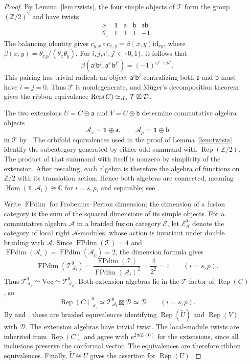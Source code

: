 \documentclass[11pt,reqno]{amsart}
\theoremstyle{definition}\newtheorem{definition}[theorem]{Definition}
\theoremstyle{remark}\newtheorem{remark}[theorem]{Remark}
\newcommand{\C}{\mathbb C}\newcommand{\Z}{\mathbb Z}\newcommand{\Q}{\mathbb Q}
\newcommand{\one}{\mathbf1}\newcommand{\slc}{\mathfrak{sl}_2}
\newcommand{\Rep}{\operatorname{Rep}}
\newcommand{\FPdim}{\operatorname{FPdim}}\newcommand{\Vir}{\operatorname{Vir}}
\newcommand{\Tc}{\mathcal T}\newcommand{\D}{\mathcal D}
\numberwithin{equation}{section}
\begin{document}
\begin{proof}
By Lemma~\ref{lem:twists}, the four simple objects of $\Tc$ form the group $(\Z/2)^2$ and have twists
\[
\begin{array}{c|rrrr}
 x&\one&\mathsf a&\mathsf b&\mathsf a\mathsf b\\\hline
 \theta_x&1&1&1&-1.
\end{array}
\]
The balancing identity gives $c_{y,x}\circ c_{x,y}=\beta(x,y)\mathrm{id}_{xy}$, where $\beta(x,y)=\theta_{xy}/(\theta_x\theta_y)$. For $i,j,i',j'\in\{0,1\}$, it follows that
\[
 \beta(\mathsf a^i\mathsf b^j,\mathsf a^{i'}\mathsf b^{j'})
 =(-1)^{ij'+ji'}.
\]
This pairing has trivial radical: an object $\mathsf a^i\mathsf b^j$ centralizing both $\mathsf a$ and $\mathsf b$ must have $i=j=0$. Thus $\Tc$ is nondegenerate, and M\"uger's decomposition theorem \cite[Theorem 4.2]{Muger} gives the ribbon equivalence $\Rep(C)\simeq_{\rm rib}\Tc\boxtimes\D$.

The two extensions $\widetilde U=C\oplus\mathsf a$ and $V=C\oplus\mathsf b$ determine commutative algebra objects
\[
 \mathcal A_s=\one\oplus\mathsf a,
 \qquad \mathcal A_p=\one\oplus\mathsf b
\]
in $\Tc$ by \cite[Theorem 3.2]{HKL}. The orbifold equivalences used in the proof of Lemma~\ref{lem:twists} identify the subcategory generated by either odd summand with $\Rep(\Z/2)$. The product of that summand with itself is nonzero by simplicity of the extension. After rescaling, each algebra is therefore the algebra of functions on $\Z/2$ with its translation action. Hence both algebras are connected, meaning $\operatorname{Hom}(\one,\mathcal A_i)\cong\C$ for $i=s,p$, and separable; see \cite[Example 3.3(i)]{DMNO}.

Write $\FPdim$ for Frobenius--Perron dimension; the dimension of a fusion category is the sum of the squared dimensions of its simple objects. For a commutative algebra $\mathcal A$ in a braided fusion category $\mathcal E$, let $\mathcal E^0_{\mathcal A}$ denote the category of local right $\mathcal A$-modules, whose action is invariant under double braiding with $\mathcal A$. Since $\FPdim(\Tc)=4$ and $\FPdim(\mathcal A_s)=\FPdim(\mathcal A_p)=2$, the dimension formula \cite[Corollary 3.32]{DMNO} gives
\[
 \FPdim(\Tc^0_{\mathcal A_i})
 =\frac{\FPdim(\Tc)}{\FPdim(\mathcal A_i)^2}
 =\frac4{2^2}=1\qquad(i=s,p).
\]
Thus $\Tc^0_{\mathcal A_s}\simeq\mathrm{Vec}\simeq\Tc^0_{\mathcal A_p}$. Both extension algebras lie in the $\Tc$ factor of $\Rep(C)$, so
\[
 \Rep(C)^0_{\mathcal A_i}
 \simeq\Tc^0_{\mathcal A_i}\boxtimes\D
 \simeq\D\qquad(i=s,p).
\]
By \cite[Theorem 3.4]{HKL} and \cite[Theorem 3.65]{CKMExt}, these are braided equivalences identifying $\Rep(\widetilde U)$ and $\Rep(V)$ with $\D$. The extension algebras have trivial twist. The local-module twists are inherited from $\Rep(C)$ and agree with $e^{2\pi iL(0)}$ for the extensions, since all inclusions preserve the conformal vector. The equivalences are therefore ribbon equivalences. Finally, $\widetilde U\cong U$ gives the assertion for $\Rep(U)$.
\end{proof}
\end{document}
